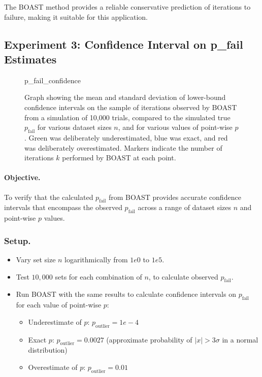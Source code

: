         The BOAST method provides a reliable conservative prediction of iterations to failure, making it suitable for this application.

\subsection{Experiment 3: Confidence Interval on p\_fail Estimates}
\label{sec:p_fail_experiment3}

    \begin{figure}[ht!]
        \centering
        {p_fail_confidence}
        \caption{Graph showing the mean and standard deviation of lower-bound confidence intervals on the sample of iterations observed by BOAST from a simulation of 10,000 trials, compared to the simulated true $p_\text{fail}$ for various dataset sizes $n$, and for various values of point-wise $p$. Green was deliberately underestimated, blue was exact, and red was deliberately overestimated. Markers indicate the number of iterations $k$ performed by BOAST at each point.}
        \label{fig:p_fail_experiment3}
    \end{figure}

    \paragraph{Objective.}
    To verify that the calculated $p_\text{fail}$ from BOAST provides accurate confidence intervals that encompass the observed $p_\text{fail}$ across a range of dataset sizes $n$ and point-wise $p$ values.

    \subsubsection{Setup.}

        \begin{itemize}
            \item Vary set size $n$ logarithmically from $1e0$ to $1e5$.
            \item Test $10{,}000$ sets for each combination of $n$, to calculate observed $p_\text{fail}$.
            \item Run BOAST with the same results to calculate confidence intervals on $p_\text{fail}$ for each value of point-wise $p$:
            \begin{itemize}
                \item Underestimate of $p$: $p_\text{outlier} = 1e-4$  
                \item Exact $p$: $p_\text{outlier} = 0.0027$ (approximate probability of $|x| > 3\sigma$ in a normal distribution)  
                \item Overestimate of $p$: $p_\text{outlier} = 0.01$
            \end{itemize}
        \end{itemize}



